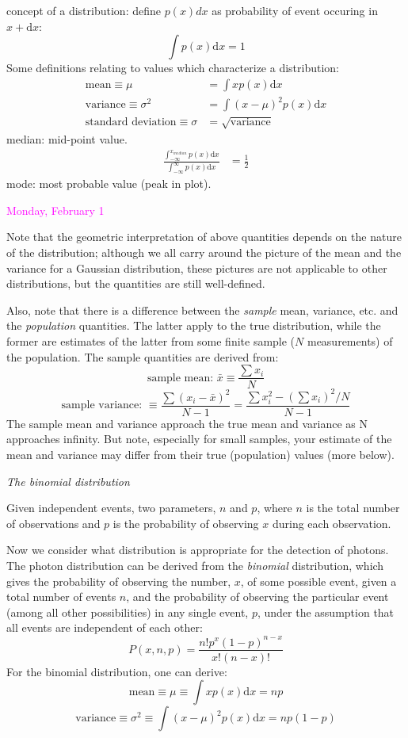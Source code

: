 \documentclass[12pt]{article}
\begin{document}
concept of a distribution: define $p(x)dx$ as probability of
event occuring in $x + \textrm{d}x$:
        $$ \int p(x)\textrm{d}x = 1 $$
Some definitions relating to values which characterize a distribution:
\begin{align*}
    \textrm{mean} \equiv \mu &= \int xp(x)\textrm{d}x \\
    \textrm{variance} \equiv \sigma^2 &= \int (x-\mu)^2 p(x)\textrm{d}x \\
    \textrm{standard\ deviation} \equiv \sigma &= \sqrt{\textrm{variance}}
\end{align*}
median: mid-point value.
\begin{align*}
    \frac{ \int_{-\infty}^{x_{median}} p(x)\textrm{d}x }
    { \int_{-\infty}^{\infty} p(x)\textrm{d}x }
    &= \frac{1}{2}
\end{align*}
mode: most probable value (peak in plot).

\textcolor{magenta}{Monday, February 1}

Note that the geometric interpretation of above quantities
depends on the nature of the distribution; although we all carry
around the picture of the mean and the variance for a Gaussian
distribution, these pictures are not applicable to other
distributions, but the quantities are still well-defined.

Also, note that there is a difference between the
\emph{sample}
mean, variance, etc. and the \emph{population} quantities. The latter apply
to the true distribution, while the former are estimates of the latter
from some finite sample ($N$ measurements) of the population. The sample
quantities are derived from:
$$\textrm{sample\ mean:\ } \bar{x} \equiv \frac{\sum x_i}{N}$$
$$\textrm{sample\ variance:\ } \equiv
  \frac{\sum (x_i-\bar{x})^2}{N-1} =
  \frac{\sum x_i^2-(\sum x_i)^2/N}{N-1}$$
The sample mean and variance approach the true mean and variance as N
approaches infinity. But note, especially for small samples, your
estimate of the mean and variance may differ from their true
(population) values (more below).

\emph{The binomial distribution}

Given independent events, two parameters, $n$ and $p$, where $n$
is the total number of observations and $p$ is the probability of
observing $x$ during each observation.

Now we consider what distribution is appropriate for the
detection of photons. The photon distribution can be derived from the
\emph{binomial} distribution, which gives the probability of observing the
number, $x$, of some possible event, given a total number of events $n$,
and the probability of observing the particular event (among all other
possibilities) in any single event, $p$, under the assumption that all
events are independent of each other:
   $$ P(x,n,p) = \frac{n!p^x(1-p)^{n-x}}{x!(n-x)!}  $$
For the binomial distribution, one can derive:
   $$ \textrm{mean} \equiv \mu \equiv \int xp(x)\textrm{d}x = np $$
   $$ \textrm{variance} \equiv \sigma^2 \equiv
      \int (x-\mu)^2p(x)\textrm{d}x = np(1-p) $$
\end{document}
